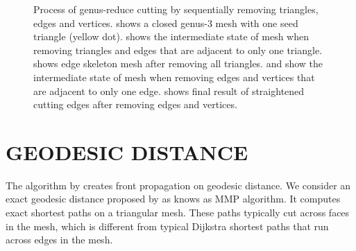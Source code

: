 \documentclass[a4paper,twoside]{article}
\begin{document}
\begin{figure}[h!]
	\hspace{0.00\columnwidth}
	\hspace{0.00\columnwidth}
	\caption[]{Process of genus-reduce cutting by sequentially removing triangles, edges and vertices.  shows a closed genus-3 mesh with one seed triangle (yellow dot).  shows the intermediate state of mesh when removing triangles and edges that are adjacent to only one triangle.  shows edge skeleton mesh after removing all triangles.  and  show the intermediate state of mesh when removing edges and vertices that are adjacent to only one edge.  shows final result of straightened cutting edges after removing edges and vertices.}
	\label{fig:fig-original_genus_reducing_process}
\end{figure}

\section{\uppercase{Geodesic Distance}}
\label{sec:geodesic distance}
\noindent The algorithm by \cite{Gu:2002:GI:566654.566589} creates front propagation on geodesic distance. We consider an exact geodesic distance proposed by \cite{Mitchell:1987:DGP:33367.33372} as knows as MMP algorithm. It computes exact shortest paths on a triangular mesh. These paths typically cut across faces in the mesh, which is different from typical Dijkstra shortest paths \cite{Dijkstra59anote} that run across edges in the mesh.
\end{document}
